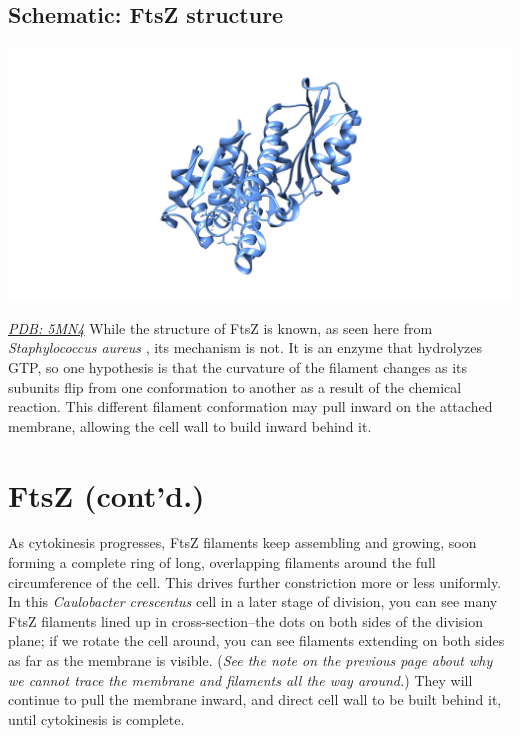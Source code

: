 \documentclass[]{tufte-book}
\begin{document}
\hypertarget{FtsZ_structure}{\subsection*{Schematic: FtsZ
structure}\label{FtsZ_structure}}

\includegraphics{img/schematics/5_9_1}

\href{http://rcsb.org/structure/5MN4}{\emph{PDB: 5MN4}} While the
structure of FtsZ is known, as seen here from \emph{Staphylococcus
aureus} \citep{wagstaff2017}, its mechanism is not. It is an enzyme that
hydrolyzes GTP, so one hypothesis is that the curvature of the filament
changes as its subunits flip from one conformation to another as a
result of the chemical reaction. This different filament conformation
may pull inward on the attached membrane, allowing the cell wall to
build inward behind it.

\section{FtsZ (cont'd.)}\label{ftsz-contd.}

As cytokinesis progresses, FtsZ filaments keep assembling and growing,
soon forming a complete ring of long, overlapping filaments around the
full circumference of the cell. This drives further constriction more or
less uniformly. In this \emph{Caulobacter crescentus} cell in a later
stage of division, you can see many FtsZ filaments lined up in
cross-section--the dots on both sides of the division plane; if we
rotate the cell around, you can see filaments extending on both sides as
far as the membrane is visible. (\emph{See the note on the previous page
about why we cannot trace the membrane and filaments all the way
around.}) They will continue to pull the membrane inward, and direct
cell wall to be built behind it, until cytokinesis is complete.
\end{document}
